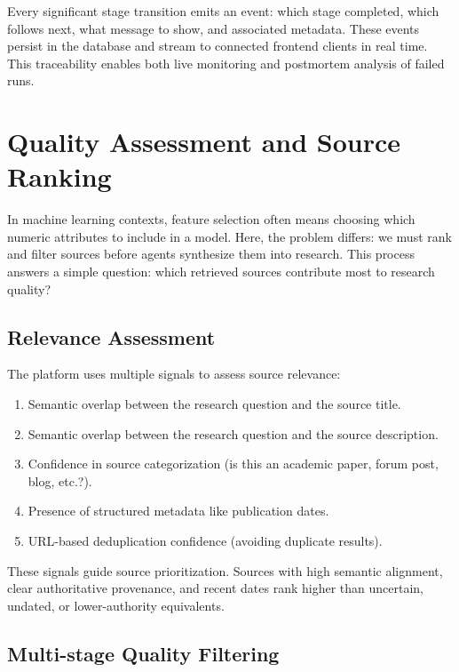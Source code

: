 \documentclass[12pt, a4paper]{article}
\begin{document}
Every significant stage transition emits an event: which stage completed, which follows next,
what message to show, and associated metadata. These events persist in the database and stream
to connected frontend clients in real time. This traceability enables both live monitoring
and postmortem analysis of failed runs.

\section{Quality Assessment and Source Ranking}

In machine learning contexts, feature selection often means choosing which numeric attributes
to include in a model. Here, the problem differs: we must rank and filter sources before agents
synthesize them into research. This process answers a simple question: which retrieved sources
contribute most to research quality?

\subsection{Relevance Assessment}

The platform uses multiple signals to assess source relevance:

\begin{enumerate}[label=\textbf{\alph*.}]
  \item Semantic overlap between the research question and the source title.
  \item Semantic overlap between the research question and the source description.
  \item Confidence in source categorization (is this an academic paper, forum post, blog, etc.?).
  \item Presence of structured metadata like publication dates.
  \item URL-based deduplication confidence (avoiding duplicate results).
\end{enumerate}

These signals guide source prioritization. Sources with high semantic alignment, clear
authoritative provenance, and recent dates rank higher than uncertain, undated,  or
lower-authority equivalents.

\subsection{Multi-stage Quality Filtering}
\end{document}
